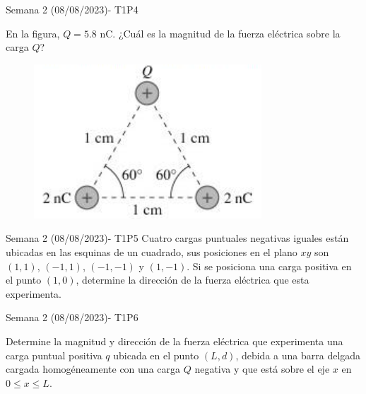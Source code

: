 \begin{frame}{Semana 2 (08/08/2023)- T1P4}
    
    En la figura, $Q = 5.8$ nC. ¿Cuál es la magnitud de la fuerza el\'ectrica sobre la carga $Q$?
    
    \begin{figure}
        \centering
        \includegraphics[scale=0.5]{figures/f3.png}
    \end{figure}
    
\end{frame}

\begin{frame}{Semana 2 (08/08/2023)- T1P5}
    Cuatro cargas puntuales negativas iguales están ubicadas en las esquinas de un cuadrado, sus posiciones en el plano $xy$ son $(1, 1)$, $(-1, 1)$, $(-1, -1)$ y $(1, -1)$. Si se posiciona una carga positiva en el punto $(1,0)$, determine la direcci\'on de la fuerza el\'ectrica que esta experimenta.
\end{frame}

\begin{frame}{Semana 2 (08/08/2023)- T1P6}
    
    Determine la magnitud y direcci\'on de la fuerza el\'ectrica que experimenta una carga puntual positiva $q$ ubicada en el punto $(L,d)$, debida a una barra delgada cargada homogéneamente con una carga $Q$ negativa y que est\'a sobre el eje $x$ en $0\leq x\leq L$.
    
\end{frame}


